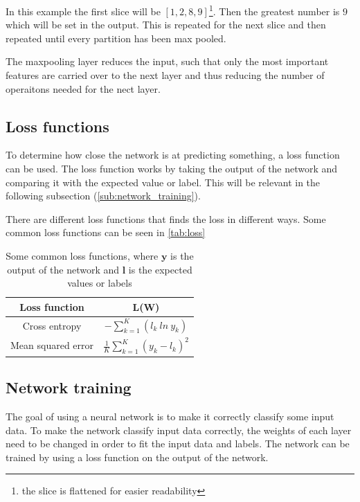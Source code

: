 In this example the first slice will be $[1, 2, 8, 9]$\footnote{the slice is flattened for easier readability}. Then the greatest number is $9$ which will be set in the output. This is repeated for the next slice and then repeated until every partition has been max pooled.

The maxpooling layer reduces the input, such that only the most important features are carried over to the next layer and thus reducing the number of operaitons needed for the nect layer.

\subsection{Loss functions}%
\label{sub:Loss functions}

To determine how close the network is at predicting something, a loss function can be used.
The loss function works by taking the output of the network and comparing it with the expected value or label.
This will be relevant in the following subsection (\autoref{sub:network_training}).

There are different loss functions that finds the loss in different ways. Some common loss functions can be seen in \autoref{tab:loss}

\begin{table}[ht]
\centering
\begin{tabular}{|c|c|}
\hline
\textbf{Loss function}  & \textbf{L(W)} \\ \hline
Cross entropy  & $-\sum^K_{k=1}(l_k\ ln\ y_k)$ \\ \hline
Mean squared error & $\frac{1}{K}\sum^K_{k=1}(y_k-l_k)^2$ \\ \hline
\end{tabular}
\caption{Some common loss functions, where $\bm{y}$ is the output of the network and $\bm{l}$ is the expected values or labels}
\label{tab:loss}
\end{table}

\subsection{Network training}%
\label{sub:network_training}

The goal of using a neural network is to make it correctly classify some input data.
To make the network classify input data correctly, the weights of each layer need to be changed in order to fit the input data and labels.
The network can be trained by using a loss function on the output of the network.

